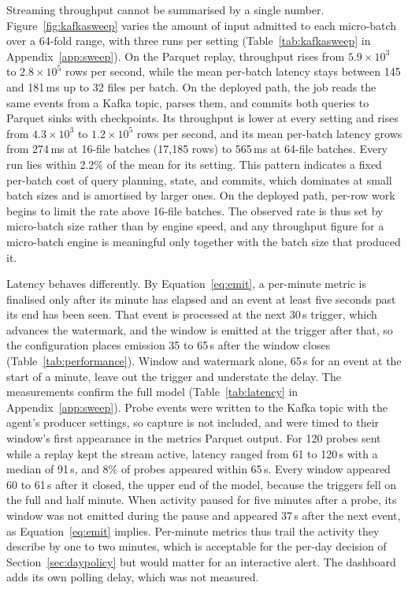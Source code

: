 \documentclass[sensors,article,submit,pdftex,oneauthor]{Definitions/mdpi}
\begin{document}


Streaming throughput cannot be summarised by a single number. Figure~\ref{fig:kafkasweep} varies the amount of input admitted to each micro-batch over a 64-fold range, with three runs per setting (Table~\ref{tab:kafkasweep} in Appendix~\ref{app:sweep}). On the Parquet replay, throughput rises from $5.9 \times 10^{3}$ to $2.8 \times 10^{5}$ rows per second, while the mean per-batch latency stays between 145 and 181\,ms up to 32 files per batch. On the deployed path, the job reads the same events from a Kafka topic, parses them, and commits both queries to Parquet sinks with checkpoints. Its throughput is lower at every setting and rises from $4.3 \times 10^{3}$ to $1.2 \times 10^{5}$ rows per second, and its mean per-batch latency grows from 274\,ms at 16-file batches (17,185 rows) to 565\,ms at 64-file batches. Every run lies within 2.2\% of the mean for its setting. This pattern indicates a fixed per-batch cost of query planning, state, and commits, which dominates at small batch sizes and is amortised by larger ones. On the deployed path, per-row work begins to limit the rate above 16-file batches. The observed rate is thus set by micro-batch size rather than by engine speed, and any throughput figure for a micro-batch engine is meaningful only together with the batch size that produced it.



Latency behaves differently. By Equation~\eqref{eq:emit}, a per-minute metric is finalised only after its minute has elapsed and an event at least five seconds past its end has been seen. That event is processed at the next 30\,s trigger, which advances the watermark, and the window is emitted at the trigger after that, so the configuration places emission 35 to 65\,s after the window closes (Table~\ref{tab:performance}). Window and watermark alone, 65\,s for an event at the start of a minute, leave out the trigger and understate the delay. The measurements confirm the full model (Table~\ref{tab:latency} in Appendix~\ref{app:sweep}). Probe events were written to the Kafka topic with the agent's producer settings, so capture is not included, and were timed to their window's first appearance in the metrics Parquet output. For 120 probes sent while a replay kept the stream active, latency ranged from 61 to 120\,s with a median of 91\,s, and 8\% of probes appeared within 65\,s. Every window appeared 60 to 61\,s after it closed, the upper end of the model, because the triggers fell on the full and half minute. When activity paused for five minutes after a probe, its window was not emitted during the pause and appeared 37\,s after the next event, as Equation~\eqref{eq:emit} implies. Per-minute metrics thus trail the activity they describe by one to two minutes, which is acceptable for the per-day decision of Section~\ref{sec:daypolicy} but would matter for an interactive alert. The dashboard adds its own polling delay, which was not measured.
\end{document}
